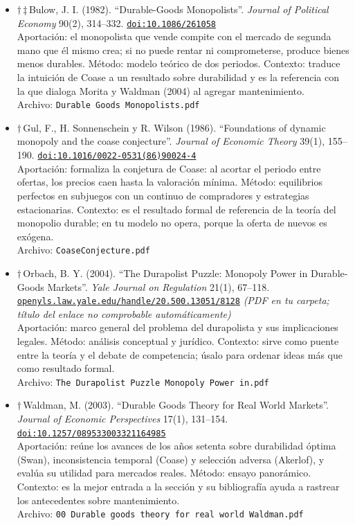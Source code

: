 \documentclass[11pt]{article}
\begin{document}
\begin{itemize}
\item $\dagger$\,$\ddagger$\,Bulow, J. I. (1982). ``Durable-Goods Monopolists''. \textit{Journal of Political Economy} 90(2), 314--332. \href{https://doi.org/10.1086/261058}{\texttt{doi:10.1086/261058}}\\
Aportación: el monopolista que vende compite con el mercado de segunda mano que él mismo crea; si no puede rentar ni comprometerse, produce bienes menos durables. Método: modelo teórico de dos periodos. Contexto: traduce la intuición de Coase a un resultado sobre durabilidad y es la referencia con la que dialoga Morita y Waldman (2004) al agregar mantenimiento.\\
{\footnotesize Archivo: \texttt{Durable Goods Monopolists.pdf}}
\item $\dagger$\,Gul, F., H. Sonnenschein y R. Wilson (1986). ``Foundations of dynamic monopoly and the coase conjecture''. \textit{Journal of Economic Theory} 39(1), 155--190. \href{https://doi.org/10.1016/0022-0531(86)90024-4}{\texttt{doi:10.1016/0022-0531(86)90024-4}}\\
Aportación: formaliza la conjetura de Coase: al acortar el periodo entre ofertas, los precios caen hasta la valoración mínima. Método: equilibrios perfectos en subjuegos con un continuo de compradores y estrategias estacionarias. Contexto: es el resultado formal de referencia de la teoría del monopolio durable; en tu modelo no opera, porque la oferta de nuevos es exógena.\\
{\footnotesize Archivo: \texttt{CoaseConjecture.pdf}}
\item $\dagger$\,Orbach, B. Y. (2004). ``The Durapolist Puzzle: Monopoly Power in Durable-Goods Markets''. \textit{Yale Journal on Regulation} 21(1), 67--118. \href{https://openyls.law.yale.edu/handle/20.500.13051/8128}{\texttt{openyls.law.yale.edu/handle/20.500.13051/8128}} \textit{(PDF en tu carpeta; título del enlace no comprobable automáticamente)}\\
Aportación: marco general del problema del durapolista y sus implicaciones legales. Método: análisis conceptual y jurídico. Contexto: sirve como puente entre la teoría y el debate de competencia; úsalo para ordenar ideas más que como resultado formal.\\
{\footnotesize Archivo: \texttt{The Durapolist Puzzle Monopoly Power in.pdf}}
\item $\dagger$\,Waldman, M. (2003). ``Durable Goods Theory for Real World Markets''. \textit{Journal of Economic Perspectives} 17(1), 131--154. \href{https://doi.org/10.1257/089533003321164985}{\texttt{doi:10.1257/089533003321164985}}\\
Aportación: reúne los avances de los años setenta sobre durabilidad óptima (Swan), inconsistencia temporal (Coase) y selección adversa (Akerlof), y evalúa su utilidad para mercados reales. Método: ensayo panorámico. Contexto: es la mejor entrada a la sección y su bibliografía ayuda a rastrear los antecedentes sobre mantenimiento.\\
{\footnotesize Archivo: \texttt{00 Durable goods theory for real world Waldman.pdf}}
\end{itemize}
\end{document}
